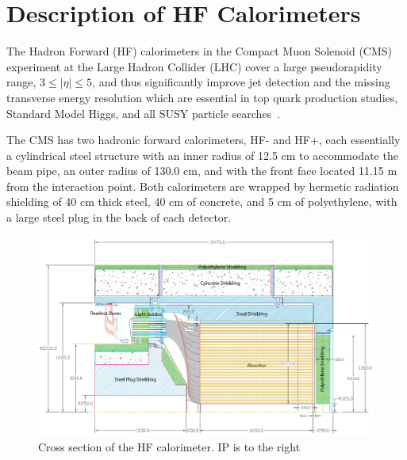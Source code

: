 \section{Description of HF Calorimeters}

The Hadron Forward (HF) calorimeters in the Compact Muon Solenoid (CMS)
experiment at the Large Hadron Collider (LHC) cover a large pseudorapidity
range, $3 \le |\eta| \le 5$, and thus significantly improve jet detection and the missing transverse energy resolution which are essential in top quark production studies, Standard Model Higgs, and all SUSY particle searches~\cite{CMSTP:1994,CMSTP:1997}.

The CMS has two hadronic forward calorimeters, HF- and HF+, each essentially a cylindrical steel structure with an inner radius of 12.5 cm to accommodate the beam pipe, an outer radius of 130.0 cm, and with the front face located 11.15 m from the interaction point. Both calorimeters are wrapped by hermetic radiation shielding of 40 cm thick steel, 40 cm of concrete, and 5 cm of polyethylene, with a large steel plug in the back of each detector.

\begin{figure}[!h]
   \begin{center}
      \includegraphics[width=1.\textwidth]{figures/ch_hfcalibration/HF_Calorimeter.png}
      \caption{Cross section of the HF calorimeter. IP is to the right}
      \label{fig:hf_description_crosssectionview}
   \end{center}
\end{figure}

